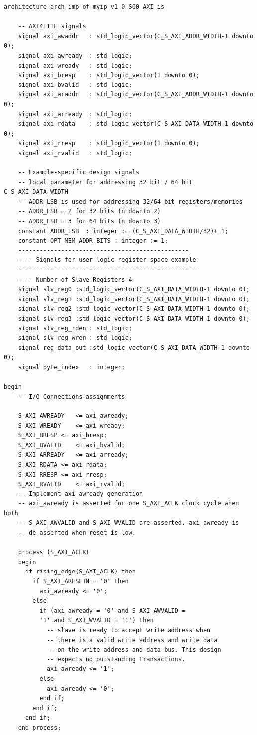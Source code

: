 \documentclass[a4paper,openright,12pt]{report}
\begin{document}
\begin{lstlisting}
architecture arch_imp of myip_v1_0_S00_AXI is

	-- AXI4LITE signals
	signal axi_awaddr	: std_logic_vector(C_S_AXI_ADDR_WIDTH-1 downto 0);
	signal axi_awready	: std_logic;
	signal axi_wready	: std_logic;
	signal axi_bresp	: std_logic_vector(1 downto 0);
	signal axi_bvalid	: std_logic;
	signal axi_araddr	: std_logic_vector(C_S_AXI_ADDR_WIDTH-1 downto 0);
	signal axi_arready	: std_logic;
	signal axi_rdata	: std_logic_vector(C_S_AXI_DATA_WIDTH-1 downto 0);
	signal axi_rresp	: std_logic_vector(1 downto 0);
	signal axi_rvalid	: std_logic;

	-- Example-specific design signals
	-- local parameter for addressing 32 bit / 64 bit C_S_AXI_DATA_WIDTH
	-- ADDR_LSB is used for addressing 32/64 bit registers/memories
	-- ADDR_LSB = 2 for 32 bits (n downto 2)
	-- ADDR_LSB = 3 for 64 bits (n downto 3)
	constant ADDR_LSB  : integer := (C_S_AXI_DATA_WIDTH/32)+ 1;
	constant OPT_MEM_ADDR_BITS : integer := 1;
	------------------------------------------------
	---- Signals for user logic register space example
	--------------------------------------------------
	---- Number of Slave Registers 4
	signal slv_reg0	:std_logic_vector(C_S_AXI_DATA_WIDTH-1 downto 0);
	signal slv_reg1	:std_logic_vector(C_S_AXI_DATA_WIDTH-1 downto 0);
	signal slv_reg2	:std_logic_vector(C_S_AXI_DATA_WIDTH-1 downto 0);
	signal slv_reg3	:std_logic_vector(C_S_AXI_DATA_WIDTH-1 downto 0);
	signal slv_reg_rden	: std_logic;
	signal slv_reg_wren	: std_logic;
	signal reg_data_out	:std_logic_vector(C_S_AXI_DATA_WIDTH-1 downto 0);
	signal byte_index	: integer;

begin
	-- I/O Connections assignments

	S_AXI_AWREADY	<= axi_awready;
	S_AXI_WREADY	<= axi_wready;
	S_AXI_BRESP	<= axi_bresp;
	S_AXI_BVALID	<= axi_bvalid;
	S_AXI_ARREADY	<= axi_arready;
	S_AXI_RDATA	<= axi_rdata;
	S_AXI_RRESP	<= axi_rresp;
	S_AXI_RVALID	<= axi_rvalid;
	-- Implement axi_awready generation
	-- axi_awready is asserted for one S_AXI_ACLK clock cycle when both
	-- S_AXI_AWVALID and S_AXI_WVALID are asserted. axi_awready is
	-- de-asserted when reset is low.

	process (S_AXI_ACLK)
	begin
	  if rising_edge(S_AXI_ACLK) then 
	    if S_AXI_ARESETN = '0' then
	      axi_awready <= '0';
	    else
	      if (axi_awready = '0' and S_AXI_AWVALID =
          '1' and S_AXI_WVALID = '1') then
	        -- slave is ready to accept write address when
	        -- there is a valid write address and write data
	        -- on the write address and data bus. This design 
	        -- expects no outstanding transactions. 
	        axi_awready <= '1';
	      else
	        axi_awready <= '0';
	      end if;
	    end if;
	  end if;
	end process;


\end{lstlisting}
\end{document}
